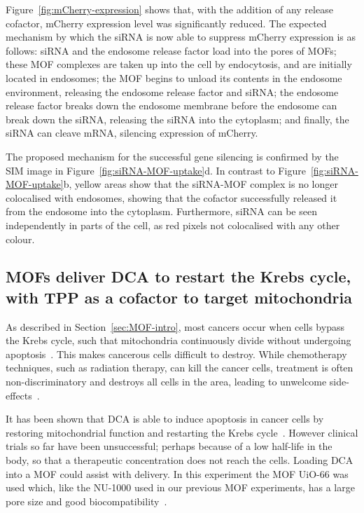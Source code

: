 Figure~\ref{fig:mCherry-expression} shows that, with the addition of any release cofactor, mCherry expression level was significantly reduced. 
The expected mechanism by which the siRNA is now able to suppress mCherry expression is as follows: siRNA and the endosome release factor load into the pores of MOFs; these MOF complexes are taken up into the cell by endocytosis, and are initially located in endosomes; the MOF begins to unload its contents in the endosome environment, releasing the endosome release factor and siRNA; the endosome release factor breaks down the endosome membrane before the endosome can break down the siRNA, releasing the siRNA into the cytoplasm; and finally, the siRNA can cleave mRNA, silencing expression of mCherry.

The proposed mechanism for the successful gene silencing is confirmed by the SIM image in Figure~\ref{fig:siRNA-MOF-uptake}d. 
In contrast to Figure~\ref{fig:siRNA-MOF-uptake}b, yellow areas show that the siRNA-MOF complex is no longer colocalised with endosomes, showing that the cofactor successfully released it from the endosome into the cytoplasm. 
Furthermore, siRNA can be seen independently in parts of the cell, as red pixels not colocalised with any other colour. 

\subsection{MOFs deliver DCA to restart the Krebs cycle, with TPP as a cofactor to target mitochondria}
As described in Section~\ref{sec:MOF-intro}, most cancers occur when cells bypass the Krebs cycle, such that mitochondria continuously divide without undergoing apoptosis~\cite{murray1993cell}.
This makes cancerous cells difficult to destroy. 
While chemotherapy techniques, such as radiation therapy, can kill the cancer cells, treatment is often non-discriminatory and destroys all cells in the area, leading to unwelcome side-effects~\cite{coates1983receiving, de1997patient, minami2010cardiovascular}. 

It has been shown that DCA is able to induce apoptosis in cancer cells by restoring mitochondrial function and restarting the Krebs cycle~\cite{bonnet2007mitochondria}. 
However clinical trials so far have been unsuccessful; perhaps because of a low half-life in the body, so that a therapeutic concentration does not reach the cells. 
Loading DCA into a MOF could assist with delivery. 
In this experiment the MOF UiO-66 was used which, like the NU-1000 used in our previous MOF experiments, has a large pore size and good biocompatibility~\cite{abanades2018mechanistic}. 

